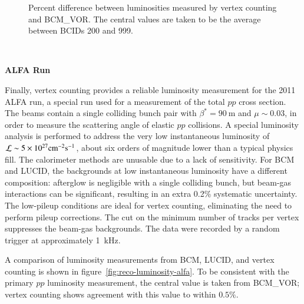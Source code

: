 \begin{figure}[h]
	\centering
	\caption{Percent difference between luminosities measured by vertex counting and BCM\_VOR. The central values are taken to be the average between BCIDs 200 and 999.}
	\label{fig:reco-luminosity-vertexing-muscan}
\end{figure}

\ 

\textbf{ALFA Run}

Finally, vertex counting provides a reliable luminosity measurement for the 2011 ALFA run, a special run used for a measurement of the total $pp$ cross section. The beams contain a single colliding bunch pair with $\beta^{*}=90~\mbox{m}$ and $\mu\sim0.03$, in order to measure the scattering angle of elastic $pp$ collisions. A special luminosity analysis is performed to address the very low instantaneous luminosity of $\mathcal{L}\sim5\times 10^{27} \mathrm{cm}^{-2}\mbox{s}^{-1}$, about six orders of magnitude lower than a typical physics fill. The calorimeter methods are unusable due to a lack of sensitivity. For BCM and LUCID, the backgrounds at low instantaneous luminosity have a different composition: afterglow is negligible with a single colliding bunch, but beam-gas interactions can be significant, resulting in an extra 0.2\% systematic uncertainty. The low-pileup conditions are ideal for vertex counting, eliminating the need to perform pileup corrections. The cut on the minimum number of tracks per vertex suppresses the beam-gas backgrounds. The data were recorded by a random trigger at approximately 1~kHz. 

A comparison of luminosity measurements from BCM, LUCID, and vertex counting is shown in figure~\ref{fig:reco-luminosity-alfa}. To be consistent with the primary $pp$ luminosity measurement, the central value is taken from BCM\_VOR; vertex counting shows agreement with this value to within $0.5\%$.

